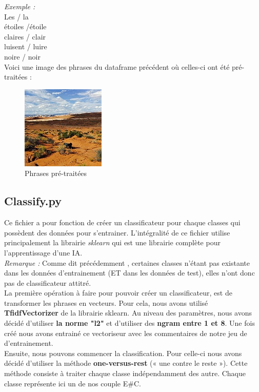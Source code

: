 \documentclass[12pt ,a4paper ]{article}
\begin{document}
\begin{multicols}{2}
\noindent \textit{Exemple :}\\
Les / la\\
étoiles /étoile\\
claires / clair\\
luisent / luire\\
noire / noir\\

\noindent Voici une image des phrases du dataframe précédent où celles-ci ont été pré-traitées : 
\begin{figure}[H]
    \begin{center}
        \includegraphics[scale=0.62]{3808.jpg}
    \end{center}
\caption{\small{Phrases pré-traitées}}
\end{figure}

\subsection{Classify.py}
Ce fichier a pour fonction de créer un classificateur pour chaque classes qui possèdent des données pour s'entrainer. L'intégralité de ce fichier utilise principalement la librairie \textit{sklearn} qui est une librairie complète pour l'apprentissage d'une IA.\\

\noindent \textit{Remarque : } 
Comme dit précédemment , certaines classes n'étant pas existante dans les données d'entrainement (ET dans les données de test), elles n'ont donc pas de classificateur attitré.\\

La première opération à faire pour pouvoir créer un classificateur, est de transformer les phrases en vecteurs. Pour cela, nous avons utilisé \textbf{TfidfVectorizer} de la librairie sklearn. Au niveau des paramètres, nous avons décidé d'utiliser\textbf{ la norme "l2"} et d'utiliser des \textbf{ngram entre 1 et 8}. Une fois créé nous avons entrainé ce vectoriseur avec les commentaires de notre jeu de d'entrainement.\\

Ensuite, nous pouvons commencer la classification. Pour celle-ci nous avons décidé d'utiliser la méthode \textbf{one-versus-rest} (« une contre le reste »). Cette méthode consiste à traiter chaque classe indépendamment des autre. Chaque classe représente ici un de nos couple E\#C.\\


\end{multicols}
\end{document}
